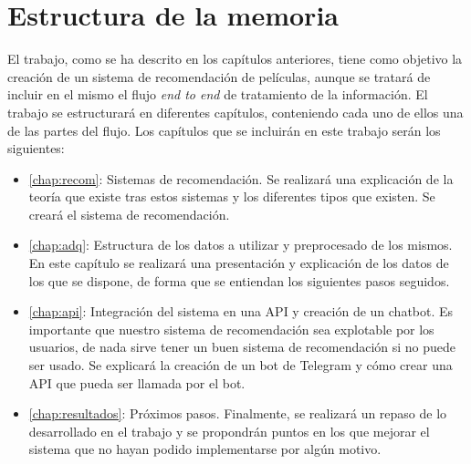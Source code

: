 \section{Estructura de la memoria}\label{sec:estructura}

El trabajo, como se ha descrito en los capítulos anteriores, tiene como objetivo la creación de un sistema de recomendación de películas, aunque se tratará de incluir en el mismo el flujo \textit{end to end} de tratamiento de la información. El trabajo se estructurará en diferentes capítulos, conteniendo cada uno de ellos una de las partes del flujo. Los capítulos que se incluirán en este trabajo serán los siguientes:

\begin{itemize}
    \item \autoref{chap:recom}: Sistemas de recomendación. Se realizará una explicación de la teoría que existe tras estos sistemas y los diferentes tipos que existen. Se creará el sistema de recomendación.
    \item \autoref{chap:adq}: Estructura de los datos a utilizar y preprocesado de los mismos. En este capítulo se realizará una presentación y explicación de los datos de los que se dispone, de forma que se entiendan los siguientes pasos seguidos.
    
    \item \autoref{chap:api}: Integración del sistema en una API y creación de un chatbot. Es importante que nuestro sistema de recomendación sea explotable por los usuarios, de nada sirve tener un buen sistema de recomendación si no puede ser usado. Se explicará la creación de un bot de Telegram y cómo crear una API que pueda ser llamada por el bot.
    \item \autoref{chap:resultados}: Próximos pasos. Finalmente, se realizará un repaso de lo desarrollado en el trabajo y se propondrán puntos en los que mejorar el sistema que no hayan podido implementarse por algún motivo.
\end{itemize}

